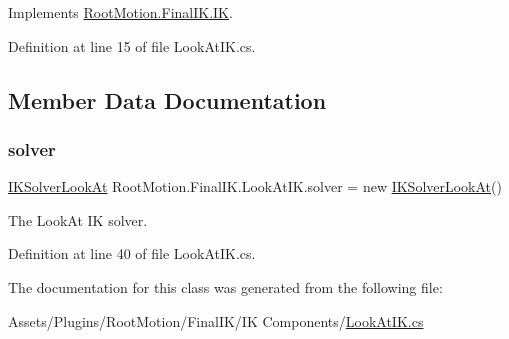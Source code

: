 Implements \mbox{\hyperlink{class_root_motion_1_1_final_i_k_1_1_i_k_a1922e31d550e27dcc60eca0d62c699c5}{Root\+Motion.\+Final\+I\+K.\+IK}}.



Definition at line 15 of file Look\+At\+I\+K.\+cs.



\subsection{Member Data Documentation}
\mbox{\label{class_root_motion_1_1_final_i_k_1_1_look_at_i_k_ad8a62d2482f33183b88189dc6e64010e}} 
\subsubsection{\texorpdfstring{solver}{solver}}
{\footnotesize\ttfamily \mbox{\hyperlink{class_root_motion_1_1_final_i_k_1_1_i_k_solver_look_at}{I\+K\+Solver\+Look\+At}} Root\+Motion.\+Final\+I\+K.\+Look\+At\+I\+K.\+solver = new \mbox{\hyperlink{class_root_motion_1_1_final_i_k_1_1_i_k_solver_look_at}{I\+K\+Solver\+Look\+At}}()}



The Look\+At IK solver. 



Definition at line 40 of file Look\+At\+I\+K.\+cs.



The documentation for this class was generated from the following file\+:\begin{DoxyCompactItemize}
\item 
Assets/\+Plugins/\+Root\+Motion/\+Final\+I\+K/\+I\+K Components/\mbox{\hyperlink{_look_at_i_k_8cs}{Look\+At\+I\+K.\+cs}}\end{DoxyCompactItemize}
